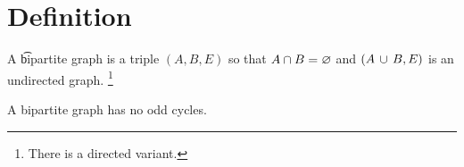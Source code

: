 
\section*{Definition}

A \t{bipartite graph} is a triple $(A, B, E)$ so that $A \cap B = \varnothing$ and $(A \,\cup\, B, E)$ is an undirected graph.
    \ifhmode\unskip\fi\footnote{
There is a directed variant.
    }

\begin{proposition}
A bipartite graph has no odd cycles.\end{proposition}
\blankpage